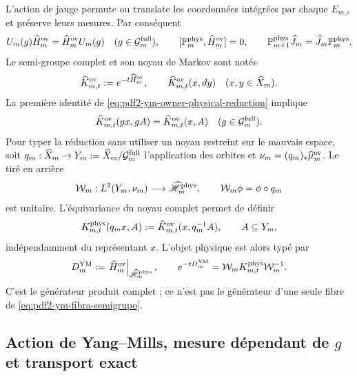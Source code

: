 L'action de jauge permute ou translate les coordonnées intégrées par chaque $E_{m,\iota}$ et préserve leurs mesures. Par conséquent
\begin{equation}\label{eq:pdf2-ym-owner-physical-reduction}
 U_m(g)\widehat H_m^{\rm ov}=\widehat H_m^{\rm ov}U_m(g)
 \quad(g\in\mathcal G_m^{\rm full}),
 \qquad
 [\mathbb P_m^{\rm phys},\widehat H_m^{\rm ov}]=0,
 \qquad
 \mathbb P_{m+1}^{\rm phys}\widehat J_m
 =\widehat J_m\mathbb P_m^{\rm phys}.
\end{equation}
Le semi-groupe complet et son noyau de Markov sont notés
\begin{equation}\label{eq:pdf2-ym-owner-full-kernel}
 \widehat K_{m,t}^{\rm ov}:=e^{-t\widehat H_m^{\rm ov}},
 \qquad
\widehat K_{m,t}^{\rm ov}(x,dy)
 \quad(x,y\in\widehat X_m).
\end{equation}
La première identité de \eqref{eq:pdf2-ym-owner-physical-reduction} implique
\begin{equation}\label{eq:pdf2-ym-owner-full-kernel-equivariance}
 \widehat K_{m,t}^{\rm ov}(gx,gA)
 =\widehat K_{m,t}^{\rm ov}(x,A)
 \quad(g\in\mathcal G_m^{\rm full}).
\end{equation}
Pour typer la réduction sans utiliser un noyau restreint sur le mauvais espace,
soit $q_m:\widehat X_m\to Y_m:=\widehat X_m/\mathcal G_m^{\rm full}$ l’application des
orbites et $\nu_m=(q_m)_*\widehat\mu_m^{\rm ov}$. Le tiré en arrière
\begin{equation}\label{eq:pdf2-ym-owner-quotient-unitary}
 \mathcal W_m:L^2(Y_m,\nu_m)\longrightarrow
 \widehat{\mathscr H}_m^{\rm phys},
 \qquad \mathcal W_m\phi=\phi\circ q_m
\end{equation}
est unitaire. L'équivariance du noyau complet permet de définir
\begin{equation}\label{eq:pdf2-ym-owner-physical-kernel}
 K_{m,t}^{\rm phys}(q_mx,A)
 :=\widehat K_{m,t}^{\rm ov}(x,q_m^{-1}A),
 \qquad A\subseteq Y_m,
\end{equation}
indépendamment du représentant $x$. L’objet physique est alors typé par
\begin{equation}\label{eq:pdf2-ym-owner-D}
 D_m^{\rm YM}
 :=\left.\widehat H_m^{\rm ov}\right|_{\widehat{\mathscr H}_m^{\rm phys}},
 \qquad
 e^{-tD_m^{\rm YM}}
 =\mathcal W_mK_{m,t}^{\rm phys}\mathcal W_m^{-1}.
\end{equation}
C'est le générateur produit complet ; ce n'est pas le générateur d'une seule fibre de \eqref{eq:pdf2-ym-fibra-semigrupo}.

\subsection{Action de Yang--Mills, mesure dépendant de $g$ et transport exact}

